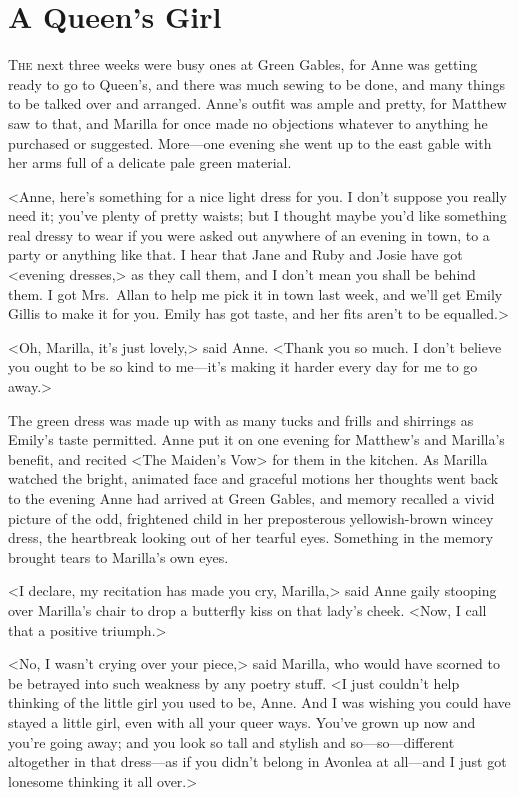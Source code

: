 \chapter{A Queen's Girl}

\lettrine[]{T}{he} next three weeks were busy ones at Green Gables, for Anne was getting ready to go to Queen's, and there was much sewing to be done, and many things to be talked over and arranged. Anne's outfit was ample and pretty, for Matthew saw to that, and Marilla for once made no objections whatever to anything he purchased or suggested. More—one evening she went up to the east gable with her arms full of a delicate pale green material.

<Anne, here's something for a nice light dress for you. I don't suppose you really need it; you've plenty of pretty waists; but I thought maybe you'd like something real dressy to wear if you were asked out anywhere of an evening in town, to a party or anything like that. I hear that Jane and Ruby and Josie have got <evening dresses,> as they call them, and I don't mean you shall be behind them. I got Mrs.~Allan to help me pick it in town last week, and we'll get Emily Gillis to make it for you. Emily has got taste, and her fits aren't to be equalled.>

<Oh, Marilla, it's just lovely,> said Anne. <Thank you so much. I don't believe you ought to be so kind to me—it's making it harder every day for me to go away.>

The green dress was made up with as many tucks and frills and shirrings as Emily's taste permitted. Anne put it on one evening for Matthew's and Marilla's benefit, and recited <The Maiden's Vow> for them in the kitchen. As Marilla watched the bright, animated face and graceful motions her thoughts went back to the evening Anne had arrived at Green Gables, and memory recalled a vivid picture of the odd, frightened child in her preposterous yellowish-brown wincey dress, the heartbreak looking out of her tearful eyes. Something in the memory brought tears to Marilla's own eyes.

<I declare, my recitation has made you cry, Marilla,> said Anne gaily stooping over Marilla's chair to drop a butterfly kiss on that lady's cheek. <Now, I call that a positive triumph.>

<No, I wasn't crying over your piece,> said Marilla, who would have scorned to be betrayed into such weakness by any poetry stuff. <I just couldn't help thinking of the little girl you used to be, Anne. And I was wishing you could have stayed a little girl, even with all your queer ways. You've grown up now and you're going away; and you look so tall and stylish and so—so—different altogether in that dress—as if you didn't belong in Avonlea at all—and I just got lonesome thinking it all over.>

